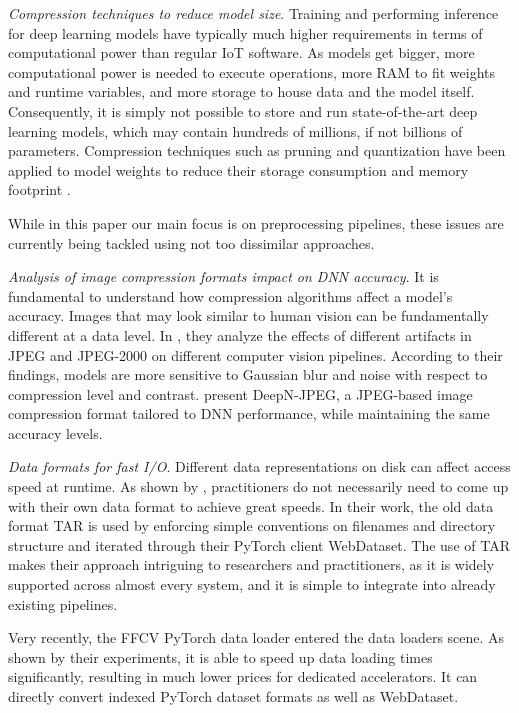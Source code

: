 \documentclass[sigconf,nonacm]{acmart}
\begin{document}
\textit{Compression techniques to reduce model size}.
Training and performing inference for deep learning models have typically much higher requirements in terms of computational power than regular IoT software.
As models get bigger, more computational power is needed to execute operations, more RAM to fit weights and runtime variables, and more storage to house data and the model itself.
Consequently, it is simply not possible to store and run state-of-the-art deep learning models, which may contain hundreds of millions, if not billions of parameters.
Compression techniques such as pruning and quantization have been applied to model weights to reduce their storage consumption and memory footprint \cite{song2015deep, davis2020pruning, torsten2021sparsity}.

While in this paper our main focus is on preprocessing pipelines, these issues are currently being tackled using not too dissimilar approaches.

\textit{Analysis of image compression formats impact on DNN accuracy}. It is fundamental to understand how compression algorithms affect a model's accuracy.
Images that may look similar to human vision can be fundamentally different at a data level.
In \cite{dodge2016understanding}, they analyze the effects of different artifacts in JPEG and JPEG-2000 on different computer vision pipelines.
According to their findings, models are more sensitive to Gaussian blur and noise with respect to compression level and contrast.
\citet{liu2018deepn-jpeg} present DeepN-JPEG, a JPEG-based image compression format tailored to DNN performance, while maintaining the same accuracy levels.

\textit{Data formats for fast I/O}. Different data representations on disk can affect access speed at runtime.
As shown by \citet{aizman2020highperformance}, practitioners do not necessarily need to come up with their own data format to achieve great speeds.
In their work, the old data format TAR is used by enforcing simple conventions on filenames and directory structure and iterated through their PyTorch client WebDataset.
The use of TAR makes their approach intriguing to researchers and practitioners, as it is widely supported across almost every system, and it is simple to integrate into already existing pipelines.

Very recently, the FFCV \cite{leclerc2022ffcv} PyTorch data loader entered the data loaders scene.
As shown by their experiments, it is able to speed up data loading times significantly, resulting in much lower prices for dedicated accelerators.
It can directly convert indexed PyTorch dataset formats as well as WebDataset.
\end{document}
